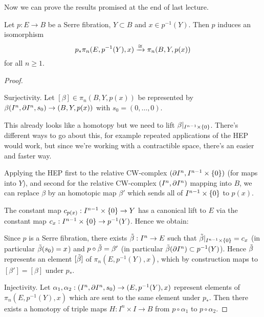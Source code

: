 Now we can prove the results promised at the end of last lecture.

\begin{lemma**}
Let $p:E\to B$ be a Serre fibration, $Y\subset B$ and $x\in p^{-1}(Y)$. Then $p$ induces an isomorphism
\[p_*\pi_n(E,p^{-1}(Y),x)\xrightarrow{\cong}\pi_n(B,Y,p(x))\]
for all $n\geq1$.
\end{lemma**}

\begin{proof}\ 

Surjectivity. Let $[\beta]\in\pi_n(B,Y,p(x))$ be represented by $\beta(I^n,\partial I^n,s_0)\to(B,Y,p(x))$ with $s_0=(0,\dots,0)$.


This already looks like a homotopy but we need to lift $\beta|_{I^{n-1}\times\{0\}}$. There's different ways to go about this, for example repeated applications of the HEP would work, but since we're working with a contractible space, there's an easier and faster way.

Applying the HEP first to the relative CW-complex $(\partial I^n,I^{n-1}\times\{0\})$ (for maps into $Y$), and second for the relative CW-complex $(I^n,\partial I^n)$ mapping into $B$, we can replace $\beta$ by an homotopic map $\beta'$ which sends all of $I^{n-1}\times\{0\}$ to $p(x)$.



The constant map $c_{p(x)}:I^{n-1}\times\{0\}\to Y$ has a canonical lift to $E$ via the constant map $c_x:I^{n-1}\times\{0\}\to p^{-1}(Y)$. Hence we obtain:
\begin{center}
\end{center}
Since $p$ is a Serre fibration, there exists $\tilde\beta:I^n\to E$ such that $\tilde\beta|_{I^{n-1}\times\{0\}}=c_x$ (in particular $\tilde\beta(s_0)=x$) and $p\circ\tilde\beta=\beta'$ (in particular $\tilde\beta(\partial I^n)\subset p^{-1}(Y)$). Hence $\tilde\beta$ represents an element $[\tilde\beta]$ of $\pi_n(E,p^{-1}(Y),x)$, which by construction maps to $[\beta']=[\beta]$ under $p_*$.

Injectivity. Let $\alpha_1,\alpha_2:(I^n,\partial I^n,s_0)\to(E,p^{-1}(Y),x)$ represent elements of $\pi_n(E,p^{-1}(Y),x)$ which are sent to the same element under $p_*$. Then there exists a homotopy of triple maps $H:I^n\times I\to B$ from $p\circ\alpha_1$ to $p\circ\alpha_2$.\vspace{-0.2cm}



\end{proof}
